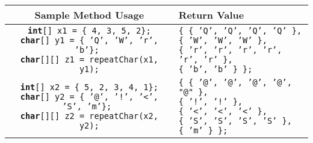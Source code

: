 \documentclass[12pt]{article}
\begin{document}
\noindent\begin{center}
\small
\begin{tabular}{| c | l |}
\hline\rule{0pt}{4ex}
Sample Method Usage & Return Value\\
\hline\rule{0pt}{5ex}
\makecell[l]{\texttt{\textbf{int}[] x1 = \{ 4, 3, 5, 2\};}\\ \texttt{\textbf{char}[] y1 = \{ 'Q', 'W', 'r', 'b'\}; } \\ \texttt{\textbf{char}[][] z1 = repeatChar(x1, y1);}} & \makecell[l]{\texttt{\{ \{ 'Q', 'Q', 'Q', 'Q' \},}\\ \hspace*{0.4cm}\texttt{\{ 'W', 'W', 'W' \},}\\ \hspace*{0.4cm}\texttt{\{ 'r', 'r', 'r', 'r', 'r', 'r' \},}\\ \hspace*{0.4cm}\texttt{\{ 'b', 'b' \} \};} }\\
\hline\rule{0pt}{5ex}
\makecell[l]{\texttt{\textbf{int}[] x2 = \{ 5, 2, 3, 4, 1\};}\\ \texttt{\textbf{char}[] y2 = \{ '@', '!', '<', 'S', 'm'\}; } \\ \texttt{\textbf{char}[][] z2 = repeatChar(x2, y2);}} & \makecell[l]{\texttt{\{ \{ '@', '@', '@', '@', "@" \},}\\ \hspace*{0.4cm}\texttt{\{ '!', '!' \},}\\ \hspace*{0.4cm}\texttt{\{ '<', '<', '<' \},}\\ \hspace*{0.4cm}\texttt{\{ 'S', 'S', 'S', 'S' \},}\\ \hspace*{0.4cm}\texttt{\{ 'm' \} \};} }\\
\hline
\end{tabular}
\end{center}
\end{document}
